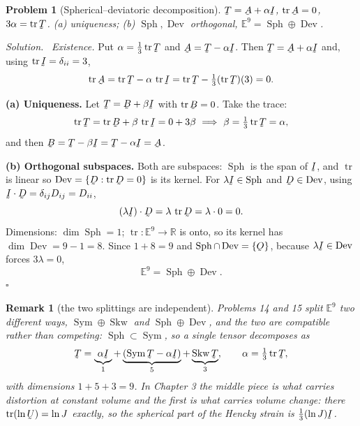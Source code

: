 \documentclass[17pt,a4paper]{extreport}
\DeclareRobustCommand{\vek}[1]{\underaccent{\tilde}{#1}}
\newcommand{\Rn}{\mathbb{R}}
\newcommand{\Sym}{\operatorname{Sym}}
\newcommand{\Skw}{\operatorname{Skw}}
\newcommand{\Sph}{\operatorname{Sph}}
\newcommand{\Dev}{\operatorname{Dev}}
\newcommand{\tr}{\operatorname{tr}}
\newcommand{\I}{\vek{I}}
\newcommand{\Ob}{\vek{O}}
\newcommand{\bA}{\vek{A}}
\newcommand{\bB}{\vek{B}}
\newcommand{\bD}{\vek{D}}
\newcommand{\bT}{\vek{T}}
\newcommand{\dd}{\delta}
\theoremstyle{scplain}
\theoremstyle{scdefn}
\newtheorem{remark}[theorem]{Remark}
\theoremstyle{scplain}
\newtheorem{problem}{Problem}
\newenvironment{solution}
 {\par\smallskip\noindent\textit{Solution.}\ }
 {\hfill$\square$\par\medskip}
\begin{document}
\begin{problem}[Spherical--deviatoric decomposition]
$\bT=\bA+\alpha\I$, $\tr\bA=0$, $3\alpha=\tr\bT$. (a) uniqueness; (b)
$\Sph,\Dev$ orthogonal, $\mathbb{E}^9=\Sph\oplus\Dev$.
\end{problem}
\begin{solution}
\emph{Existence.} Put $\alpha=\tfrac13\tr\bT$ and $\bA=\bT-\alpha\I$.
Then $\bT=\bA+\alpha\I$ and, using $\tr\I=\dd_{ii}=3$,
\[
   \tr\bA=\tr\bT-\alpha\,\tr\I=\tr\bT-\tfrac13(\tr\bT)(3)=0 .
\]

\textbf{(a) Uniqueness.} Let $\bT=\bB+\beta\I$ with $\tr\bB=0$. Take the
trace:
\[
   \tr\bT=\tr\bB+\beta\,\tr\I=0+3\beta
   \ \Longrightarrow\ \beta=\tfrac13\tr\bT=\alpha ,
\]
and then $\bB=\bT-\beta\I=\bT-\alpha\I=\bA$.

\textbf{(b) Orthogonal subspaces.} Both are subspaces: $\Sph$ is the span
of $\I$, and $\tr$ is linear so $\Dev=\{\bD:\tr\bD=0\}$ is its kernel.
For $\lambda\I\in\Sph$ and $\bD\in\Dev$, using
$\I\cdot\bD=\dd_{ij}D_{ij}=D_{ii}$,
\[
   (\lambda\I)\cdot\bD=\lambda\,\tr\bD=\lambda\cdot0=0 .
\]
Dimensions: $\dim\Sph=1$; $\tr:\mathbb{E}^{9}\to\Rn$ is onto, so its
kernel has $\dim\Dev=9-1=8$. Since $1+8=9$ and
$\Sph\cap\Dev=\{\Ob\}$, because $\lambda\I\in\Dev$ forces
$3\lambda=0$,
\[
   \mathbb{E}^{9}=\Sph\oplus\Dev .
\]
\end{solution}

\begin{remark}[the two splittings are independent]\label{rem:twosplits}
Problems 14 and 15 split $\mathbb{E}^{9}$ two different ways,
$\Sym\oplus\Skw$ and $\Sph\oplus\Dev$, and the two are compatible rather
than competing: $\Sph\subset\Sym$, so a single tensor decomposes as
\[
   \bT=\underbrace{\alpha\I}_{1}
      +\underbrace{(\Sym\bT-\alpha\I)}_{5}
      +\underbrace{\Skw\bT}_{3},
   \qquad \alpha=\tfrac13\tr\bT,
\]
with dimensions $1+5+3=9$. In Chapter 3 the middle piece is what carries
distortion at constant volume and the first is what carries volume change:
there $\tr(\ln\vek{U})=\ln J$ exactly, so the spherical part of the Hencky
strain is $\tfrac13(\ln J)\I$.
\end{remark}
\end{document}
